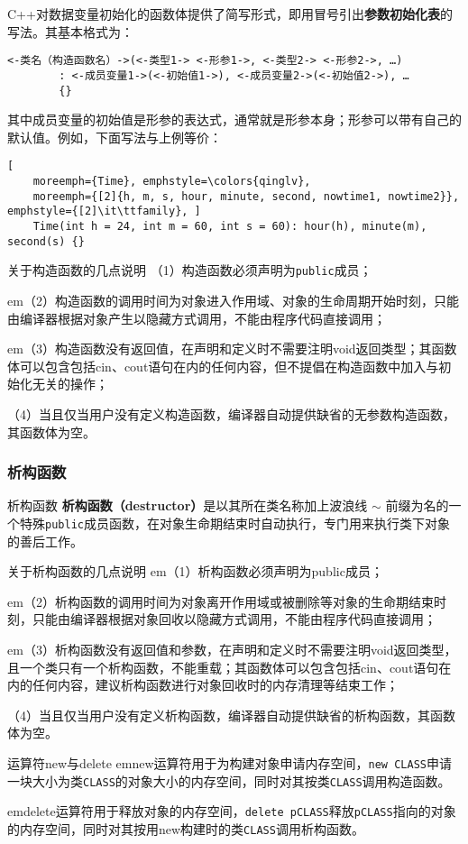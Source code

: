 \documentclass[10pt, a4paper, oneside, fontset=none]{ctexart}
\theoremstyle{plain}
\theoremstyle{definition}
\newcommand{\colors}[1]{\color{#1!75!black}}
\newcommand{\hang}[1][1]{\hangafter 1 \hangindent #1em}
\newcommand{\de}[2][]{\begin{defil}{#1}\kai #2\end{defil}}
\newcommand{\zhu}[2][]{\begin{note}{#1}\xiu #2\end{note}}
\newcommand{\tboba}[1]{\textbf{\kai\color{bali!75!black}#1}}
\begin{document}
C++对数据变量初始化的函数体提供了简写形式，即用冒号引出\tboba{参数初始化表}的写法。其基本格式为：
\begin{lstlisting}[style=intro]
	<-类名（构造函数名）->(<-类型1-> <-形参1->, <-类型2-> <-形参2->, …)
		: <-成员变量1->(<-初始值1->), <-成员变量2->(<-初始值2->), … 
		{}
\end{lstlisting}
其中成员变量的初始值是形参的表达式，通常就是形参本身；形参可以带有自己的默认值。例如，下面写法与上例等价：
\begin{lstlisting}[
	moreemph={Time}, emphstyle=\colors{qinglv}, 
	moreemph={[2]{h, m, s, hour, minute, second, nowtime1, nowtime2}}, emphstyle={[2]\it\ttfamily}, ]
	Time(int h = 24, int m = 60, int s = 60): hour(h), minute(m), second(s) {}
\end{lstlisting}

\zhu[关于构造函数的几点说明]{
	（1）构造函数必须声明为\texttt{public}成员；

	\hang[2]（2）构造函数的调用时间为对象进入作用域、对象的生命周期开始时刻，只能由编译器根据对象产生以隐藏方式调用，不能由程序代码直接调用；
	
	\hang[2]（3）构造函数没有返回值，在声明和定义时不需要注明void返回类型；其函数体可以包含包括cin、cout语句在内的任何内容，但不提倡在构造函数中加入与初始化无关的操作；
	
	（4）当且仅当用户没有定义构造函数，编译器自动提供缺省的无参数构造函数，其函数体为空。
}

\subsubsection{析构函数}

\de[析构函数]{
	\tboba{析构函数（destructor）}是以其所在类名称加上波浪线 $\sim$ 前缀为名的一个特殊\texttt{public}成员函数，在对象生命期结束时自动执行，专门用来执行类下对象的善后工作。
}
\zhu[关于析构函数的几点说明]{
	\hang[2]（1）析构函数必须声明为public成员；

	\hang[2]（2）析构函数的调用时间为对象离开作用域或被删除等对象的生命期结束时刻，只能由编译器根据对象回收以隐藏方式调用，不能由程序代码直接调用；

	\hang[2]（3）析构函数没有返回值和参数，在声明和定义时不需要注明void返回类型，且一个类只有一个析构函数，不能重载；其函数体可以包含包括cin、cout语句在内的任何内容，建议析构函数进行对象回收时的内存清理等结束工作；

	（4）当且仅当用户没有定义析构函数，编译器自动提供缺省的析构函数，其函数体为空。
}
\zhu[运算符new与delete]{
	\hang new运算符用于为构建对象申请内存空间，\texttt{new CLASS}申请一块大小为类\texttt{CLASS}的对象大小的内存空间，同时对其按类\texttt{CLASS}调用构造函数。

	\hang delete运算符用于释放对象的内存空间，\texttt{delete pCLASS}释放\texttt{pCLASS}指向的对象的内存空间，同时对其按用new构建时的类\texttt{CLASS}调用析构函数。
}
\end{document}

